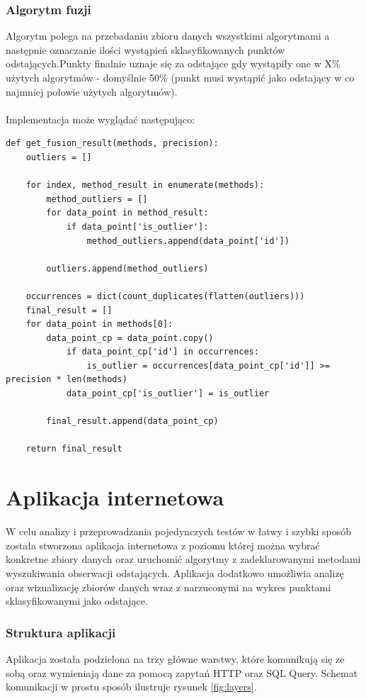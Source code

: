 \documentclass[eng,printmode]{mgr}
\begin{document}
\subsection{Algorytm fuzji}
Algorytm polega na przebadaniu zbioru danych wszystkimi algorytmami a następnie oznaczanie ilości wystąpień sklasyfikowanych punktów odstających.Punkty finalnie uznaje się za odstające gdy wystąpiły one w X\% użytych algorytmów - domyślnie 50\% (punkt musi wystąpić jako odstający w co najmniej połowie użytych algorytmów).
\\\\
Implementacja może wyglądać następująco:
\\
\begin{lstlisting}
def get_fusion_result(methods, precision):
    outliers = []

    for index, method_result in enumerate(methods):
        method_outliers = []
        for data_point in method_result:
            if data_point['is_outlier']:
                method_outliers.append(data_point['id'])

        outliers.append(method_outliers)

    occurrences = dict(count_duplicates(flatten(outliers)))
    final_result = []
    for data_point in methods[0]:
        data_point_cp = data_point.copy()
            if data_point_cp['id'] in occurrences:
                is_outlier = occurrences[data_point_cp['id']] >= precision * len(methods)
            data_point_cp['is_outlier'] = is_outlier

        final_result.append(data_point_cp)

    return final_result
\end{lstlisting}
\chapter{Aplikacja internetowa}
W celu analizy i przeprowadzania pojedynczych testów w łatwy i szybki sposób została stworzona aplikacja internetowa z poziomu której można wybrać konkretne zbiory danych oraz uruchomić algorytmy z zadeklarowanymi metodami wyszukiwania obserwacji odstających. Aplikacja dodatkowo umożliwia analizę oraz wizualizację zbiorów danych wraz z narzuconymi na wykres punktami sklasyfikowanymi jako odstające.
\subsection{Struktura aplikacji}
Aplikacja została podzielona na trzy główne warstwy, które komunikują się ze sobą oraz wymieniają dane za pomocą zapytań HTTP oraz SQL Query. Schemat komunikacji w prostu sposób ilustruje rysunek \ref{fig:layers}.
\end{document}
